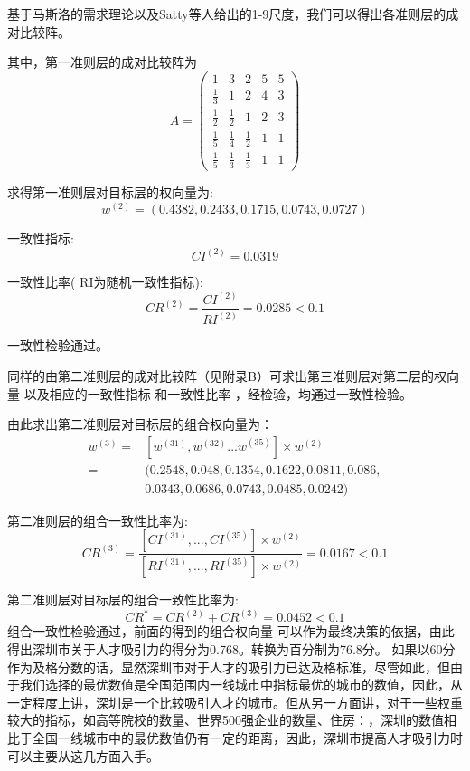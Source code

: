 \documentclass[withoutpreface,bwprint]{cumcmthesis} %
\begin{document}
基于马斯洛的需求理论以及Satty等人给出的1-9尺度，我们可以得出各准则层的成对比较阵。

其中，第一准则层的成对比较阵为
\begin{equation}A = \left( {\begin{array}{*{20}{c}}
1&3&2&5&5\\
{\frac{1}{3}}&1&2&4&3\\
{\frac{1}{2}}&{\frac{1}{2}}&1&2&3\\
{\frac{1}{5}}&{\frac{1}{4}}&{\frac{1}{2}}&1&1\\
{\frac{1}{5}}&{\frac{1}{3}}&{\frac{1}{3}}&1&1
\end{array}} \right)\end{equation}

求得第一准则层对目标层的权向量为: \begin{equation}{w^{(2)}} = (0.4382,0.2433,0.1715,0.0743,0.0727)\end{equation}

一致性指标: \begin{equation}C{I^{(2)}} = 0.0319\end{equation}

一致性比率( RI为随机一致性指标): \begin{equation}C{R^{(2)}} = \frac{{C{I^{(2)}}}}{{R{I^{(2)}}}} = 0.0285 < 0.1\end{equation} 

一致性检验通过。

同样的由第二准则层的成对比较阵（见附录B）可求出第三准则层对第二层的权向量 以及相应的一致性指标 和一致性比率 ，经检验，均通过一致性检验。

由此求出第二准则层对目标层的组合权向量为：  \begin{equation}\begin{split}{w^{(3)}} = &[{w^{(31)}},{w^{(32)}}...{w^{(35)}}] \times {w^{(2)}} \\
=&(0.2548,0.048,0.1354,0.1622,0.0811,0.086,\\&0.0343,0.0686,0.0743,0.0485,0.0242)\end{split}\end{equation}

第二准则层的组合一致性比率为:
 \begin{equation}C{R^{(3)}} = \frac{{[C{I^{(31)}},...,C{I^{(35)}}] \times {w^{(2)}}}}{{[R{I^{(31)}},...,R{I^{(35)}}] \times {w^{(2)}}}} =0.0167<0.1\end{equation}
 
 第二准则层对目标层的组合一致性比率为:
 \begin{equation}C{R^*} = C{R^{(2)}} + C{R^{(3)}} = 0.0452 < 0.1\end{equation}
 组合一致性检验通过，前面的得到的组合权向量 可以作为最终决策的依据，由此得出深圳市关于人才吸引力的得分为0.768。转换为百分制为76.8分。
如果以60分作为及格分数的话，显然深圳市对于人才的吸引力已达及格标准，尽管如此，但由于我们选择的最优数值是全国范围内一线城市中指标最优的城市的数值，因此，从一定程度上讲，深圳是一个比较吸引人才的城市。但从另一方面讲，对于一些权重较大的指标，如高等院校的数量、世界500强企业的数量、住房：，深圳的数值相比于全国一线城市中的最优数值仍有一定的距离，因此，深圳市提高人才吸引力时可以主要从这几方面入手。
\end{document}
